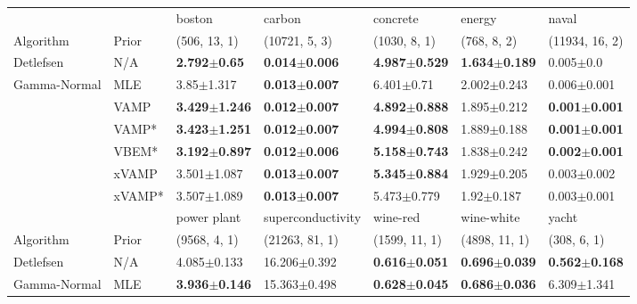 \begin{tabular}{lllllll}
\toprule
             &        &                    boston &                    carbon &                  concrete &                    energy &                     naval \\
Algorithm & Prior& (506, 13, 1)& (10721, 5, 3)& (1030, 8, 1)& (768, 8, 2)& (11934, 16, 2)\\
\midrule
Detlefsen & N/A &   \textbf{2.792$\pm$0.65} &  \textbf{0.014$\pm$0.006} &  \textbf{4.987$\pm$0.529} &  \textbf{1.634$\pm$0.189} &             0.005$\pm$0.0 \\
Gamma-Normal & MLE &            3.85$\pm$1.317 &  \textbf{0.013$\pm$0.007} &            6.401$\pm$0.71 &           2.002$\pm$0.243 &           0.006$\pm$0.001 \\
             & VAMP &  \textbf{3.429$\pm$1.246} &  \textbf{0.012$\pm$0.007} &  \textbf{4.892$\pm$0.888} &           1.895$\pm$0.212 &  \textbf{0.001$\pm$0.001} \\
             & VAMP* &  \textbf{3.423$\pm$1.251} &  \textbf{0.012$\pm$0.007} &  \textbf{4.994$\pm$0.808} &           1.889$\pm$0.188 &  \textbf{0.001$\pm$0.001} \\
             & VBEM* &  \textbf{3.192$\pm$0.897} &  \textbf{0.012$\pm$0.006} &  \textbf{5.158$\pm$0.743} &           1.838$\pm$0.242 &  \textbf{0.002$\pm$0.001} \\
             & xVAMP &           3.501$\pm$1.087 &  \textbf{0.013$\pm$0.007} &  \textbf{5.345$\pm$0.884} &           1.929$\pm$0.205 &           0.003$\pm$0.002 \\
             & xVAMP* &           3.507$\pm$1.089 &  \textbf{0.013$\pm$0.007} &           5.473$\pm$0.779 &            1.92$\pm$0.187 &           0.003$\pm$0.001 \\
\midrule
             &        &               power plant &          superconductivity &                  wine-red &                wine-white &                     yacht \\
Algorithm & Prior& (9568, 4, 1)& (21263, 81, 1)& (1599, 11, 1)& (4898, 11, 1)& (308, 6, 1)\\
\midrule
Detlefsen & N/A &           4.085$\pm$0.133 &           16.206$\pm$0.392 &  \textbf{0.616$\pm$0.051} &  \textbf{0.696$\pm$0.039} &  \textbf{0.562$\pm$0.168} \\
Gamma-Normal & MLE &  \textbf{3.936$\pm$0.146} &           15.363$\pm$0.498 &  \textbf{0.628$\pm$0.045} &  \textbf{0.686$\pm$0.036} &           6.309$\pm$1.341 \\

\end{tabular}

